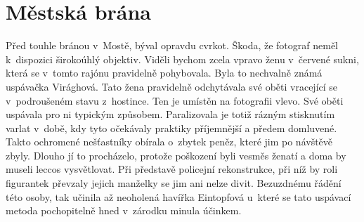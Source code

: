 
\chapter{Městská brána}

Před touhle bránou v~Mostě, býval opravdu cvrkot. Škoda, že fotograf neměl
k~dispozici širokoúhlý objektiv. Viděli bychom zcela vpravo ženu v~červené
sukni, která se v~tomto rajónu pravidelně pohybovala. Byla to nechvalně známá
uspávačka Virághová. Tato žena pravidelně odchytávala své oběti vracející se
v~podroušeném stavu z~hostince. Ten je umístěn na fotografii vlevo. Své oběti
uspávala pro ni typickým způsobem. Paralizovala je totiž rázným stisknutím
varlat v~době, kdy tyto očekávaly praktiky příjemnější a předem domluvené.
Takto ochromené nešťastníky obírala o~zbytek peněz, které jim po návštěvě
zbyly. Dlouho jí to procházelo, protože poškození byli vesměs ženatí a doma by
museli leccos vysvětlovat. Při představě policejní rekonstrukce, při níž by
roli figurantek převzaly jejich manželky se jim ani nelze divit. Bezuzdnému
řádění této osoby, tak učinila až neoholená havířka Eintopfová u~které se tato
uspávací metoda pochopitelně hned v~zárodku minula účinkem.
